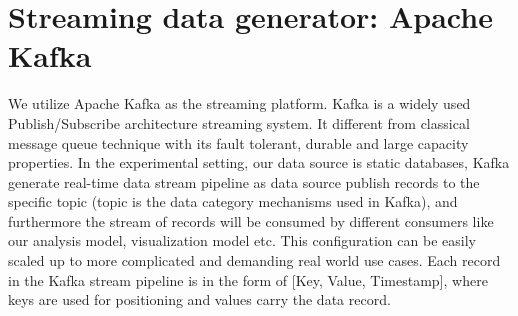 \section{Streaming data generator: Apache Kafka}
\label{sec:Streaming data generator: Apache Kafka}

We utilize Apache Kafka as the streaming platform. Kafka is a widely used Publish/Subscribe architecture streaming system. It different from classical message queue technique with its fault tolerant, durable and large capacity properties. In the experimental setting, our data source is static databases, Kafka generate real-time data stream pipeline as data source publish records to the specific topic (topic is the data category mechanisms used in Kafka), and furthermore the stream of records will be consumed by different consumers like our analysis model, visualization model etc. This configuration can be easily scaled up to more complicated and demanding real world use cases. Each record in the Kafka stream pipeline is in the form of [Key, Value, Timestamp], where keys are used for positioning and values carry the data record.
